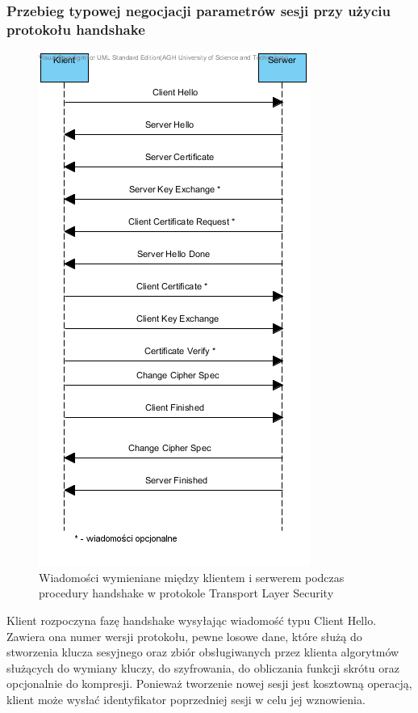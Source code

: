 \subsubsection{Przebieg typowej negocjacji parametrów sesji przy użyciu protokołu handshake}

		\begin{figure}[h]
			\centering
				\includegraphics{img/HandshakeTLS.png}
			\caption{Wiadomości wymieniane między klientem i serwerem podczas procedury handshake w protokole Transport Layer Security}
			\label{Wiadomości wymieniane między klientem i serwerem podczas procedury handshake w protokole Transport Layer Security}
		\end{figure}

Klient rozpoczyna fazę handshake wysyłając wiadomość typu Client Hello\cite{MSTLS03}. Zawiera ona numer wersji protokołu, pewne losowe dane, które służą do stworzenia klucza sesyjnego oraz zbiór obsługiwanych przez klienta algorytmów służących do wymiany kluczy, do szyfrowania, do obliczania funkcji skrótu oraz opcjonalnie do kompresji. Ponieważ tworzenie nowej sesji jest kosztowną operacją, klient może wysłać identyfikator poprzedniej sesji w celu jej wznowienia.

